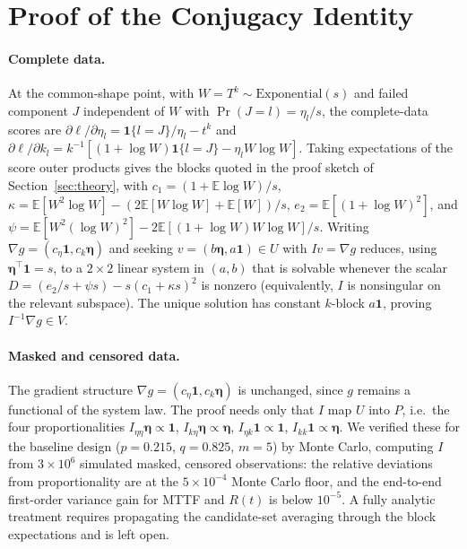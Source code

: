 \documentclass[11pt]{article}
\renewcommand{\v}[1]{\boldsymbol{#1}}
\begin{document}
\section{Proof of the Conjugacy Identity}
\label{app:proof}

\paragraph{Complete data.} At the common-shape point, with $W = T^k \sim \mathrm{Exponential}(s)$ and failed component $J$ independent of $W$ with $\Pr(J=l) = \eta_l/s$, the complete-data scores are $\partial \ell/\partial \eta_l = \mathbf{1}\{l = J\}/\eta_l - t^k$ and $\partial \ell/\partial k_l = k^{-1}[(1 + \log W)\mathbf{1}\{l=J\} - \eta_l W \log W]$. Taking expectations of the score outer products gives the blocks quoted in the proof sketch of Section~\ref{sec:theory}, with $c_1 = (1 + \mathbb{E}\log W)/s$, $\kappa = \mathbb{E}[W^2\log W] - (2\mathbb{E}[W\log W] + \mathbb{E}[W])/s$, $e_2 = \mathbb{E}[(1+\log W)^2]$, and $\psi = \mathbb{E}[W^2(\log W)^2] - 2\mathbb{E}[(1+\log W)W\log W]/s$. Writing $\nabla g = (c_\eta \v 1, c_k \v\eta)$ and seeking $v = (b\v\eta, a\v 1) \in U$ with $Iv = \nabla g$ reduces, using $\v\eta^\top\v 1 = s$, to a $2\times 2$ linear system in $(a,b)$ that is solvable whenever the scalar $D = (e_2/s + \psi s) - s(c_1 + \kappa s)^2$ is nonzero (equivalently, $I$ is nonsingular on the relevant subspace). The unique solution has constant $k$-block $a\v 1$, proving $I^{-1}\nabla g \in V$.

\paragraph{Masked and censored data.} The gradient structure $\nabla g = (c_\eta\v 1, c_k\v\eta)$ is unchanged, since $g$ remains a functional of the system law. The proof needs only that $I$ map $U$ into $P$, i.e.\ the four proportionalities $I_{\eta\eta}\v\eta \propto \v 1$, $I_{k\eta}\v\eta \propto \v\eta$, $I_{\eta k}\v 1 \propto \v 1$, $I_{kk}\v 1 \propto \v\eta$. We verified these for the baseline design ($p = 0.215$, $q = 0.825$, $m=5$) by Monte Carlo, computing $I$ from $3\times 10^6$ simulated masked, censored observations: the relative deviations from proportionality are at the $5\times 10^{-4}$ Monte Carlo floor, and the end-to-end first-order variance gain for MTTF and $R(t)$ is below $10^{-5}$. A fully analytic treatment requires propagating the candidate-set averaging through the block expectations and is left open.



\end{document}
